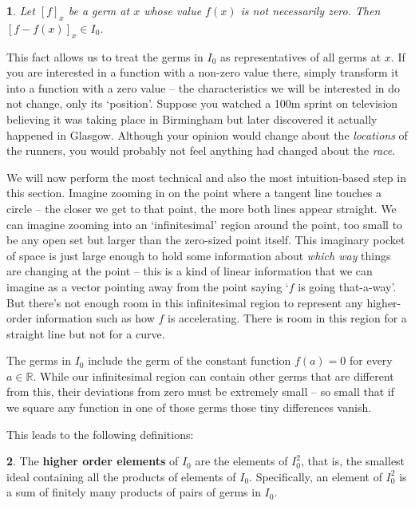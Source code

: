 \documentclass[oneside,english]{amsbook}
\numberwithin{section}{chapter}
\theoremstyle{plain}
\newtheorem{thm}{\protect\theoremname}
\theoremstyle{definition}
\newtheorem{defn}[thm]{\protect\definitionname}
\providecommand{\definitionname}{Definition}
\providecommand{\theoremname}{Theorem}
\begin{document}
			\begin{thm}
				Let $[f]_x$ be a germ at $x$ whose value $f(x)$ is not necessarily zero. Then $[f - f(x)]_x \in I_0$.
			\end{thm}
							
			This fact allows us to treat the germs in $I_0$ as representatives of all germs at $x$. If you are interested in a function with a non-zero value there, simply transform it into a function with a zero value -- the characteristics we will be interested in do not change, only its `position'. Suppose you watched a 100m sprint on television believing it was taking place in Birmingham but later discovered it actually happened in Glasgow. Although your opinion would change about the \emph{locations} of the runners, you would probably not feel anything had changed about the \emph{race}.
			
			We will now perform the most technical and also the most intuition-based step in this section. Imagine zooming in on the point where a tangent line touches a circle -- the closer we get to that point, the more both lines appear straight. We can imagine zooming into an `infinitesimal' region around the point, too small to be any open set but larger than the zero-sized point itself. This imaginary pocket of space is just large enough to hold some information about \emph{which way} things are changing at the point -- this is a kind of linear information that we can imagine as a vector pointing away from the point saying `$f$ is going that-a-way'. But there's not enough room in this infinitesimal region to represent any higher-order information such as how $f$ is accelerating. There is room in this region for a straight line but not for a curve.
			
			The germs in $I_0$ include the germ of the constant function $f(a) = 0$ for every $a\in \mathbb{R}$. While our infinitesimal region can contain other germs that are different from this, their deviations from zero must be extremely small -- so small that if we square any function in one of those germs those tiny differences vanish. 
			
			This leads to the following definitions: 
			
			\begin{defn}
				The \textbf{higher order elements} of $I_0$ are the elements of $I_0^2$, that is, the smallest ideal containing all the products of elements of $I_0$. Specifically, an element of $I_0^2$ is a sum of finitely many products of pairs of germs in $I_0$. 
			\end{defn}
			
\end{document}

